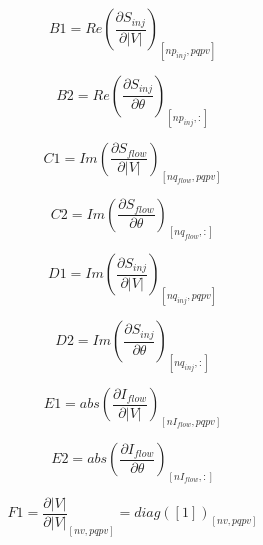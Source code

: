 \documentclass[a4paper,twoside,fleqn]{tufte-book}
\begin{document}
\begin{equation}
B1 = Re\left(\frac{\partial S_{inj}}{\partial |V|}\right)_{[np_{inj}, pqpv]}
\end{equation}


\begin{equation}
B2 = Re\left(\frac{\partial S_{inj}}{\partial \theta}\right)_{[np_{inj}, :]}
\end{equation}


\begin{equation}
C1 = Im\left(\frac{\partial S_{flow}}{\partial |V|}\right)_{[nq_{flow}, pqpv]}
\end{equation}


\begin{equation}
C2 = Im\left(\frac{\partial S_{flow}}{\partial \theta}\right)_{[nq_{flow}, :]}
\end{equation}

\begin{equation}
D1 = Im\left(\frac{\partial S_{inj}}{\partial |V|}\right)_{[nq_{inj}, pqpv]}
\end{equation}


\begin{equation}
D2 = Im\left(\frac{\partial S_{inj}}{\partial \theta}\right)_{[nq_{inj}, :]}
\end{equation}


\begin{equation}
E1 = abs\left(\frac{\partial I_{flow}}{\partial |V|}\right)_{[nI_{flow}, pqpv]}
\end{equation}


\begin{equation}
E2 = abs\left(\frac{\partial I_{flow}}{\partial \theta}\right)_{[nI_{flow}, :]}
\end{equation}

\begin{equation}
F1 = \frac{\partial |V|}{\partial |V|}_{[nv, pqpv]} = diag([1])_{[nv, pqpv]}
\end{equation}
\end{document}
